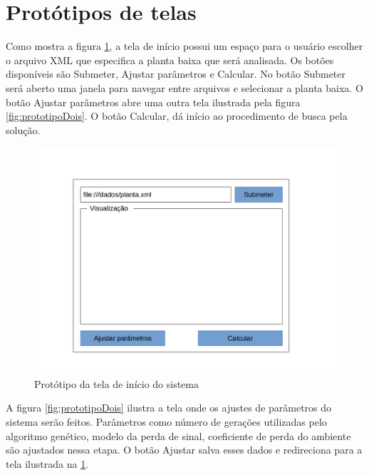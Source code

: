 \documentclass[tc,twoside]{iiufrgs}
\begin{document}
\section{Protótipos de telas}

Como mostra a figura \ref{fig:prototipoUm}, a tela de início possui um espaço para o usuário escolher o arquivo XML que especifica a planta baixa que será analisada. Os botões disponíveis são Submeter, Ajustar parâmetros e Calcular. 
No botão Submeter será aberto uma janela para navegar entre arquivos e selecionar a planta baixa. O botão Ajustar parâmetros abre uma outra tela ilustrada pela figura \ref{fig:prototipoDois}. O botão Calcular, dá início ao procedimento de busca pela solução.

\begin{figure}[!h]
	\centering
	\includegraphics[scale=0.4]{img/prototipo1.png}
	\caption{Protótipo da tela de início do sistema}
	\label{fig:prototipoUm}
\end{figure}

A figura \ref{fig:prototipoDois} ilustra a tela onde os ajustes de parâmetros do sistema serão feitos. Parâmetros como número de gerações utilizadas pelo algoritmo genético, modelo da perda de sinal, coeficiente de perda do ambiente são ajustados nessa etapa. O botão Ajustar salva esses dados e redireciona para a tela ilustrada na \ref{fig:prototipoUm}.
\end{document}
